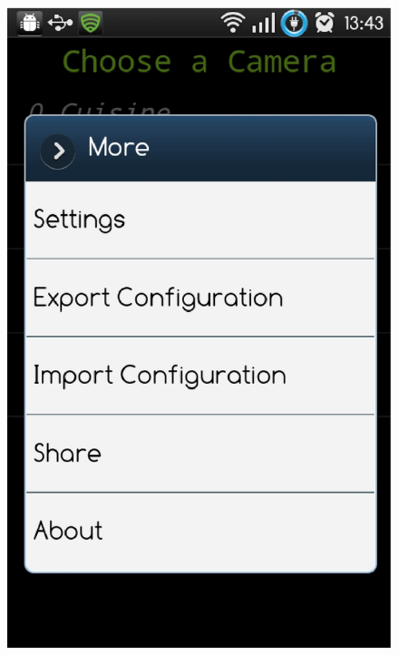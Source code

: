 \begin{figure}[H]
\centering
  \label{langue}
   \includegraphics[scale=0.4]{Images/en.eps}

\end{figure}
